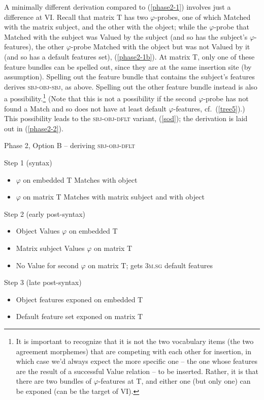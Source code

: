 \documentclass[output=paper
,modfonts
,nonflat]{langsci/langscibook}
\begin{document}
A minimally different derivation compared to (\ref{phase2-1}) involves just a difference at VI. Recall that matrix T has two $\varphi$-probes, one of which Matched with the matrix subject, and the other with the object; while the $\varphi$-probe that Matched with the subject was Valued by the subject (and so has the subject's $\varphi$-features), the other $\varphi$-probe Matched with the object but was not Valued by it (and so has a default features set), (\ref{phase2-1b}).  At matrix T, only one of these feature bundles can be spelled out, since they are at the same insertion site (by assumption). Spelling out the feature bundle that contains the subject's features derives \textsc{sbj-obj-sbj}, as above. Spelling out the other feature bundle instead is also a possibility.\footnote{It is important to recognize that it is not the two vocabulary items (the two agreement morphemes) that are competing with each other for insertion, in which case we'd always expect the more specific one -- the one whose features are the result of a successful Value relation -- to be inserted. Rather, it is that there are two bundles of $\varphi$-features at T, and either one (but only one) can be exponed (can be the target of VI).} (Note that this is not a possibility if the second $\varphi$-probe has not found a Match and so does not have at least default $\varphi$-features, cf.\ (\ref{tree5}).) This possibility leads to the \textsc{sbj-obj-dflt} variant, (\ref{sod}); the derivation is laid out in (\ref{phase2-2}).\largerpage[2]

\begin{exe}
\ex Phase 2, Option B -- deriving \textsc{sbj-obj-dflt} \label{phase2-2}
\begin{xlist}
\ex Step 1 (syntax) \begin{itemize}
            \item $\varphi$ on embedded T Matches with object
            \item $\varphi$ on matrix T Matches with matrix subject and with object
            \end{itemize}
\ex Step 2 (early post-syntax) \begin{itemize}
            \item Object Values $\varphi$ on embedded T
            \item Matrix subject Values $\varphi$ on matrix T
            \item No Value for second $\varphi$ on matrix T; gets 3\textsc{m.sg} default features
            \end{itemize}
\ex Step 3 (late post-syntax) \begin{itemize}
            \item Object features exponed on embedded T
            \item Default feature set exponed on matrix T
            \end{itemize}
\end{xlist}
\end{exe}
\end{document}
